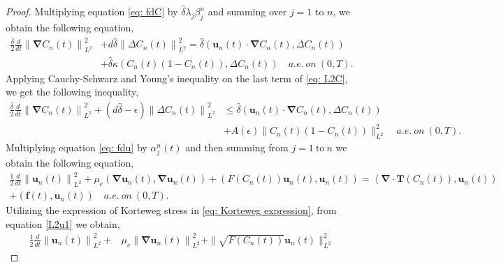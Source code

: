 \documentclass[final,3p,times]{elsarticle}
\theoremstyle{plain}
\theoremstyle{remark}
\theoremstyle{plain}
\theoremstyle{remark}
\begin{document}
\begin{proof}Multiplying equation \eqref{eq: fdC} by $\hat \delta \lambda_j \beta_j^n$ and summing over $j=1$ to $n$,  we obtain the following equation,
\begin{align}
\frac{\hat{\delta}}{2} \frac{d}{dt} \left\| \boldsymbol{\nabla} C_n\left(t\right) \right\|_{L^2}^2 & + d\hat{\delta} \left\| \Delta C_n\left(t\right) \right\|_{L^2}^2
= \hat{\delta} \left( \mathbf{u}_n\left(t\right) \cdot \boldsymbol{\nabla} C_n\left(t\right), \Delta C_n\left(t\right) \right) \nonumber \\ & + \hat \delta \kappa\left(C_n\left(t\right)\left(1-C_n\left(t\right)\right),\Delta C_n\left(t\right)\right) \quad a.e.\  on \ \left(0,T\right). \label{eq: L2C}
\end{align}
Applying Cauchy-Schwarz and Young's inequality on the last term of \eqref{eq: L2C}, we get the following inequality,
\begin{align}
\frac{\hat{\delta}}{2} \frac{d}{dt} \left\| \boldsymbol{\nabla} C_n\left(t\right) \right\|_{L^2}^2 + \left(d\hat{\delta}-\epsilon\right) \left\| \Delta C_n\left(t\right) \right\|_{L^2}^2
& \le \hat{\delta} \left( \mathbf{u}_n\left(t\right) \cdot \boldsymbol{\nabla} C_n\left(t\right), \Delta C_n\left(t\right) \right)\nonumber\\ 
& + A\left(\epsilon\right)\|C_n\left(t\right)\left(1-C_n\left(t\right)\right)\|_{L^2}^2 \quad a.e.\  on \ \left(0,T\right). \label{eq: L2 nabC 2}
\end{align}
Multiplying equation \eqref{eq: fdu} by $\alpha_j^n\left(t\right)$ and then summing from $j=1\ \text{to} \ n$ we obtain the following equation,
  \begin{align}
      \frac{1}{2} \frac{d}{dt} \left\| \mathbf{u}_n\left(t\right) \right\|_{L^2}^2 +\mu_e\left(\boldsymbol{\nabla} \mathbf{u}_n\left(t\right),\boldsymbol{\nabla} \mathbf{u}_n\left(t\right)\right) + \left( F\left(C_n\left(t\right)\right) 
 \mathbf{u}_n\left(t\right),\mathbf{u}_n\left(t\right)\right) = \left \langle \boldsymbol{\nabla} \cdot \mathbf{T}\left(C_n\left(t\right)\right),\mathbf{u}_n\left(t\right) \right \rangle \nonumber\\+\left(\mathbf f\left(t\right),\mathbf{u}_n\left(t\right)\right) \quad a.e. \ on\ \left(0,T\right). \label{L2u1}
        \end{align}
Utilizing the expression of Korteweg stress in \eqref{eq: Korteweg expression}, from equation \eqref{L2u1} we obtain,
\begin{align}
\frac{1}{2} \frac{d}{dt} \left\| \mathbf{u}_n\left(t\right) \right\|_{L^2}^2 + &\mu_e \left\| \boldsymbol{\nabla} \mathbf{u}_n\left(t\right) \right\|_{L^2}^2 + \|\sqrt{ F\left(C_n\left(t\right)\right) }\mathbf u_n\left(t\right) \|_{L^2}^2

\end{align}
\end{proof}
\end{document}
